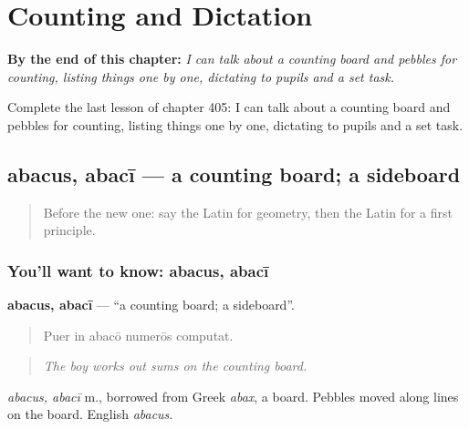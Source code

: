 
\chapter{Counting and Dictation}
\label{ch:la-counting-and-dictation}

\begin{chapteropening}
\textbf{By the end of this chapter:} \emph{I can talk about a counting board and pebbles for counting, listing things one by one, dictating to pupils and a set task.}

Complete the last lesson of chapter 405: I can talk about a counting board and pebbles for counting, listing things one by one, dictating to pupils and a set task.
\end{chapteropening}

\section[abacus, abacī]{abacus, abacī — a counting board; a sideboard}

\label{lesson:LA-C405-abacus}



\begin{quote}
Before the new one: say the Latin for geometry, then the Latin for a first principle.
\end{quote}

\subsection*{You'll want to know: abacus, abacī}
\textbf{abacus, abacī} — \textquotedblleft{}a counting board; a sideboard\textquotedblright{}.

\begin{quote}
Puer in abacō numerōs computat.
\end{quote}

\begin{quote}
\emph{The boy works out sums on the counting board.}
\end{quote}

\emph{abacus, abacī} m., borrowed from Greek \emph{abax}, a board. Pebbles moved along lines on the board. English \emph{abacus}.

